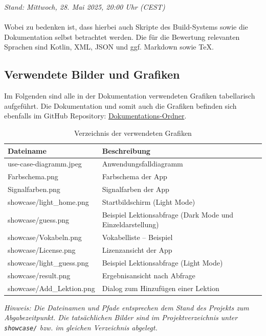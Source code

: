 \documentclass[12pt,a4paper]{article}
\begin{document}
\textit{Stand: Mittwoch, 28. Mai 2025, 20:00 Uhr (CEST)}
\\\\
Wobei zu bedenken ist, dass hierbei auch Skripte des Build-Systems sowie die Dokumentation selbst betrachtet werden. Die für die Bewertung relevanten Sprachen sind Kotlin, XML, JSON und ggf. Markdown sowie TeX.

\newpage
\subsection*{Verwendete Bilder und Grafiken}

Im Folgenden sind alle in der Dokumentation verwendeten Grafiken tabellarisch aufgeführt. Die Dokumentation und somit auch die Grafiken befinden sich ebenfalls im GitHub Repository: \href{https://github.com/Erik-Donath/Palabra/tree/cc55c524ebff2f6db85a36f6ec2c0afb23070e2f/docs}{Dokumentations-Ordner}.

\begin{table}[htbp]
\centering
\caption{Verzeichnis der verwendeten Grafiken}
\begin{tabularx}{\textwidth}{ll}
\toprule
\textbf{Dateiname} & \textbf{Beschreibung} \\
\midrule
use-case-diagramm.jpeg & Anwendungsfalldiagramm \\
Farbschema.png & Farbschema der App \\
Signalfarben.png & Signalfarben der App \\
showcase/light\_home.png & Startbildschirm (Light Mode) \\
showcase/guess.png & Beispiel Lektionsabfrage (Dark Mode und Einzeldarstellung) \\
showcase/Vokabeln.png & Vokabelliste – Beispiel \\
showcase/License.png & Lizenzansicht der App \\
showcase/light\_guess.png & Beispiel Lektionsabfrage (Light Mode) \\
showcase/result.png & Ergebnisansicht nach Abfrage \\
showcase/Add\_Lektion.png & Dialog zum Hinzufügen einer Lektion \\
\bottomrule
\end{tabularx}
\end{table}

\textit{Hinweis: Die Dateinamen und Pfade entsprechen dem Stand des Projekts zum Abgabezeitpunkt. Die tatsächlichen Bilder sind im Projektverzeichnis unter \texttt{showcase/} bzw. im gleichen Verzeichnis abgelegt.}
\end{document}
